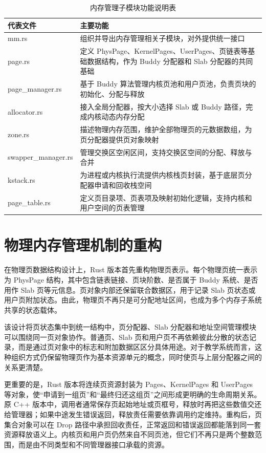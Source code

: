 \begin{table}[htbp]
  \centering
  \caption{内存管理子模块功能说明表}\label{tab:mm-modules}
  \begin{tabular}{p{}p{}}
    \toprule
    \textbf{代表文件} & \textbf{主要功能} \\
    \midrule
    mm.rs & 组织并导出内存管理相关子模块，对外提供统一接口 \\
    page.rs & 定义 PhysPage、KernelPages、UserPages、页链表等基础数据结构，作为 Buddy 分配器和 Slab 分配器的共同基础 \\
    page\_manager.rs & 基于 Buddy 算法管理内核页池和用户页池，负责页块的初始化、分配与释放 \\
    allocator.rs & 接入全局分配器，按大小选择 Slab 或 Buddy 路径，完成内核动态内存分配 \\
    zone.rs & 描述物理内存范围，维护全部物理页的元数据数组，为页分配器提供页对象映射 \\
    swapper\_manager.rs & 管理交换区空闲区间，支持交换区空间的分配、释放与合并 \\
    kstack.rs & 为进程或内核执行流提供内核栈页封装，基于底层页分配器申请和回收栈空间 \\
    page\_table.rs & 定义页目录项、页表项及映射初始化逻辑，支持内核和用户空间的页表管理 \\
    \bottomrule
  \end{tabular}
\end{table}

\section{物理内存管理机制的重构}

在物理页数据结构设计上，Rust 版本首先重构物理页表示。每个物理页统一表示为 PhysPage 结构，其中包含链表链接、页块阶数、是否属于 Buddy 系统、是否用作 Slab 页等元信息。页对象内部还保留联合数据区，用于记录 Slab 页状态或用户页附加状态。由此，物理页不再只是可分配地址区间，也成为多个内存子系统共享的状态载体。

该设计将页状态集中到统一结构中，页分配器、Slab 分配器和地址空间管理模块可以围绕同一页对象协作。普通页、Slab 页和用户页不再依赖彼此分散的状态记录，而是通过页对象中的标志和附加数据区区分具体用途。对于教学系统而言，这种组织方式仍保留物理页作为基本资源单元的概念，同时使页与上层分配器之间的关系更清楚。

更重要的是，Rust 版本将连续页资源封装为 Pages、KernelPages 和 UserPages 等对象，使“申请到一组页”和“最终归还这组页”之间形成更明确的生命周期关系。原 C++ 版本中，调用者通常保存页起始地址或页框号，释放时再把这些数值交还给管理器；如果中途发生错误返回，释放责任需要依靠调用约定维持。重构后，页集合对象可以在 Drop 路径中承担回收责任，正常返回和错误返回都能落到同一套资源释放语义上。内核页和用户页仍然来自不同页池，但它们不再只是两个整数范围，而是由不同类型和不同管理器接口承载的资源。

